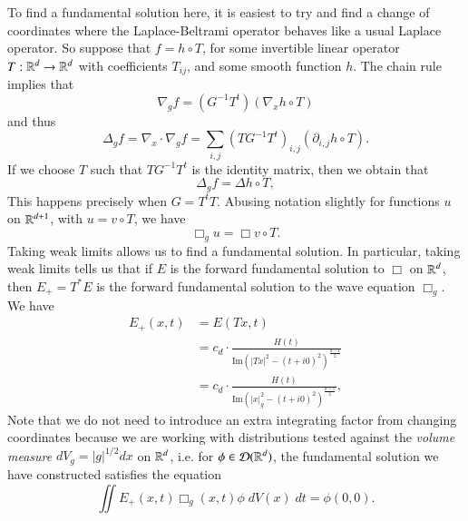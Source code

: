 To find a fundamental solution here, it is easiest to try and find a change of coordinates where the Laplace-Beltrami operator behaves like a usual Laplace operator. So suppose that $f = h \circ T$, for some invertible linear operator $T: \operatorname{\mathbb{R}}^d \to \operatorname{\mathbb{R}}^d$ with coefficients $T_{ij}$, and some smooth function $h$. The chain rule implies that
%
\[ \nabla_g f = (G^{-1} T^t) (\nabla_x h \circ T) \]
%
and thus
%
\[ \Delta_g f = \nabla_x \cdot \nabla_g f = \sum_{i,j} (TG^{-1}T^t)_{i,j} (\partial_{i,j} h \circ T). \]
%
If we choose $T$ such that $TG^{-1}T^t$ is the identity matrix, then we obtain that
\[ \Delta_g f = \Delta h \circ T, \]
%
This happens precisely when $G = T^t T$. Abusing notation slightly for functions $u$ on $\operatorname{\mathbb{R}}^{d+1}$, with $u = v \circ T$, we have
%
\[ \Box_g u = \Box v \circ T. \]
%
Taking weak limits allows us to find a fundamental solution. In particular, taking weak limits tells us that if $E$ is the forward fundamental solution to $\Box$ on $\operatorname{\mathbb{R}}^d$, then $E_+ = T^* E$ is the forward fundamental solution to the wave equation $\Box_g$. We have
%
\begin{align*}
    E_+(x,t) &= E(Tx, t)\\
    &= c_d \cdot \frac{H(t)}{\text{Im}(|Tx|^2 - (t + i0)^2)^{\frac{d-1}{2}}}\\
    &= c_d \cdot \frac{H(t)}{\text{Im}(|x|_g^2 - (t + i0)^2)^{\frac{d-1}{2}}},
\end{align*}
%
Note that we do not need to introduce an extra integrating factor from changing coordinates because we are working with distributions tested against the \emph{volume measure} $dV_g = |g|^{1/2} dx$ on $\operatorname{\mathbb{R}}^d$, i.e. for $\phi \in \operatorname{\mathcal{D}}(\operatorname{\mathbb{R}}^d)$, the fundamental solution we have constructed satisfies the equation
%   
\[ \iint E_+(x,t) \Box_g(x,t) \phi\; dV(x)\; dt = \phi(0,0). \]
%
%
%
%
%
%
%
